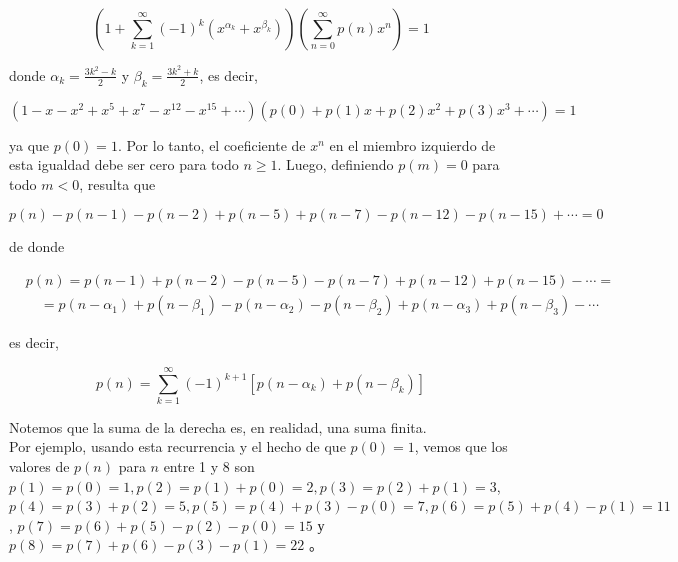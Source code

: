 \documentclass[10pt]{article}
\begin{document}
$$
\left(1+\sum_{k=1}^{\infty}(-1)^{k}\left(x^{\alpha_{k}}+x^{\beta_{k}}\right)\right)\left(\sum_{n=0}^{\infty} p(n) x^{n}\right)=1
$$

donde $\alpha_{k}=\frac{3 k^{2}-k}{2}$ y $\beta_{k}=\frac{3 k^{2}+k}{2}$, es decir,

$$
\left(1-x-x^{2}+x^{5}+x^{7}-x^{12}-x^{15}+\cdots\right)\left(p(0)+p(1) x+p(2) x^{2}+p(3) x^{3}+\cdots\right)=1
$$

ya que $p(0)=1$. Por lo tanto, el coeficiente de $x^{n}$ en el miembro izquierdo de esta igualdad debe ser cero para todo $n \geq 1$. Luego, definiendo $p(m)=0$ para todo $m<0$, resulta que

$$
p(n)-p(n-1)-p(n-2)+p(n-5)+p(n-7)-p(n-12)-p(n-15)+\cdots=0
$$

de donde

$$
\begin{aligned}
& p(n)=p(n-1)+p(n-2)-p(n-5)-p(n-7)+p(n-12)+p(n-15)-\cdots= \\
& \quad=p\left(n-\alpha_{1}\right)+p\left(n-\beta_{1}\right)-p\left(n-\alpha_{2}\right)-p\left(n-\beta_{2}\right)+p\left(n-\alpha_{3}\right)+p\left(n-\beta_{3}\right)-\cdots
\end{aligned}
$$

es decir,

$$
p(n)=\sum_{k=1}^{\infty}(-1)^{k+1}\left[p\left(n-\alpha_{k}\right)+p\left(n-\beta_{k}\right)\right]
$$

Notemos que la suma de la derecha es, en realidad, una suma finita.\\
Por ejemplo, usando esta recurrencia y el hecho de que $p(0)=1$, vemos que los valores de $p(n)$ para $n$ entre 1 y 8 son $p(1)=p(0)=1, p(2)=p(1)+p(0)=2, p(3)=p(2)+p(1)=3$, $p(4)=p(3)+p(2)=5, p(5)=p(4)+p(3)-p(0)=7, p(6)=p(5)+p(4)-p(1)=11$, $p(7)=p(6)+p(5)-p(2)-p(0)=15$ у $p(8)=p(7)+p(6)-p(3)-p(1)=22$ 。
\end{document}

